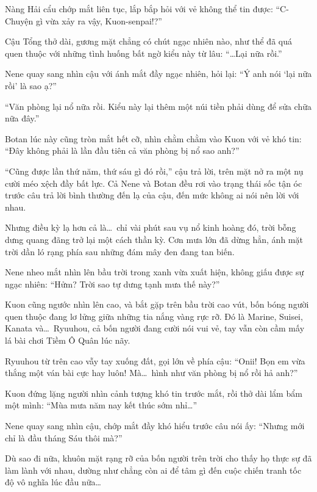 \documentclass[../main.tex]{subfiles}
\begin{document}
Nàng Hải cẩu chớp mắt liên tục, lắp bắp hỏi với vẻ không thể tin được: ``C-Chuyện gì vừa xảy ra vậy, Kuon-senpai!?''

Cậu Tổng thở dài, gương mặt chẳng có chút ngạc nhiên nào, như thể đã quá quen thuộc với những tình huống bất ngờ kiểu này từ lâu: ``\dots Lại nữa rồi.''

Nene quay sang nhìn cậu với ánh mắt đầy ngạc nhiên, hỏi lại: ``Ý anh nói `lại nữa rồi' là sao ạ?''

``Văn phòng lại nổ nữa rồi. Kiểu này lại thêm một núi tiền phải dùng để sửa chữa nữa đây.''

Botan lúc này cũng tròn mắt hết cỡ, nhìn chằm chằm vào Kuon với vẻ khó tin: ``Đây không phải là lần đầu tiên cả văn phòng bị nổ sao anh?''

``Cũng được lần thứ năm, thứ sáu gì đó rồi,'' cậu trả lời, trên mặt nở ra một nụ cười méo xệch đầy bất lực. Cả Nene và Botan đều rơi vào trạng thái sốc tận óc trước câu trả lời bình thường đến lạ của cậu, đến mức không ai nói nên lời với nhau.

Nhưng điều kỳ lạ hơn cả là\dots\ chỉ vài phút sau vụ nổ kinh hoàng đó, trời bỗng dưng quang đãng trở lại một cách thần kỳ. Cơn mưa lớn đã dừng hẳn, ánh mặt trời dần ló rạng phía sau những đám mây đen đang tan biến.

Nene nheo mắt nhìn lên bầu trời trong xanh vừa xuất hiện, không giấu được sự ngạc nhiên: ``Hửm? Trời sao tự dưng tạnh mưa thế này?''

Kuon cũng ngước nhìn lên cao, và bắt gặp trên bầu trời cao vút, bốn bóng người quen thuộc đang lơ lửng giữa những tia nắng vàng rực rỡ. Đó là Marine, Suisei, Kanata và\dots\ Ryuuhou, cả bốn người đang cười nói vui vẻ, tay vẫn còn cầm mấy lá bài chơi Tiềm Ô Quân lúc nãy.


Ryuuhou từ trên cao vẫy tay xuống đất, gọi lớn về phía cậu: ``Onii! Bọn em vừa thắng một ván bài cực hay luôn! Mà\dots\ hình như văn phòng bị nổ rồi hả anh?''

Kuon đứng lặng người nhìn cảnh tượng khó tin trước mắt, rồi thở dài lẩm bẩm một mình: ``Mùa mưa năm nay kết thúc sớm nhỉ\dots''

Nene quay sang nhìn cậu, chớp mắt đầy khó hiểu trước câu nói ấy: ``Nhưng mới chỉ là đầu tháng Sáu thôi mà?''

Dù sao đi nữa, khuôn mặt rạng rỡ của bốn người trên trời cho thấy họ thực sự đã làm lành với nhau, dường như chẳng còn ai để tâm gì đến cuộc chiến tranh tốc độ vô nghĩa lúc đầu nữa\dots
\end{document}
